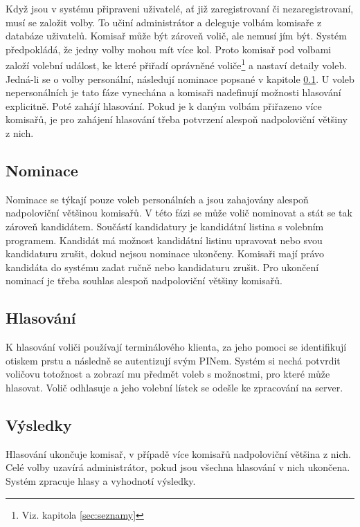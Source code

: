 \documentclass[11pt,twoside,a4paper]{book}
\begin{document}
Když jsou v systému připraveni uživatelé, ať již zaregistrovaní či nezaregistrovaní, musí se založit volby. To učiní administrátor a deleguje volbám komisaře z databáze uživatelů. Komisař může být zároveň volič, ale nemusí jím být. Systém předpokládá, že jedny volby mohou mít více kol. Proto komisař pod volbami založí volební událost, ke které přiřadí oprávněné voliče\footnote{Viz. kapitola \ref{sec:seznamy}} a nastaví detaily voleb. Jedná-li se o volby personální, následují nominace popsané v kapitole \ref{sec:nominace}. U voleb nepersonálních je tato fáze vynechána a komisaři nadefinují možnosti hlasování explicitně. Poté zahájí hlasování. Pokud je k daným volbám přiřazeno více komisařů, je pro zahájení hlasování třeba potvrzení alespoň nadpoloviční většiny z nich.

\subsection{Nominace} \label{sec:nominace}

Nominace se týkají pouze voleb personálních a jsou zahajovány alespoň nadpoloviční většinou komisařů. V této fázi se může volič nominovat a stát se tak zároveň kandidátem. Součástí kandidatury je kandidátní listina s volebním programem. Kandidát má možnost kandidátní listinu upravovat nebo svou kandidaturu zrušit, dokud nejsou nominace ukončeny. Komisaři mají právo kandidáta do systému zadat ručně nebo kandidaturu zrušit. Pro ukončení nominací je třeba souhlas alespoň nadpoloviční většiny komisařů. 

\subsection{Hlasování}

K hlasování voliči používají terminálového klienta, za jeho pomoci se identifikují otiskem prstu a následně se autentizují svým PINem. Systém si nechá potvrdit voličovu totožnost a zobrazí mu předmět voleb s možnostmi, pro které může hlasovat. Volič odhlasuje a jeho volební lístek se odešle ke zpracování na server. 

\subsection{Výsledky}

Hlasování ukončuje komisař, v případě více komisařů nadpoloviční většina z nich. Celé volby uzavírá administrátor, pokud jsou všechna hlasování v nich ukončena. Systém zpracuje hlasy a vyhodnotí výsledky.
\end{document}
